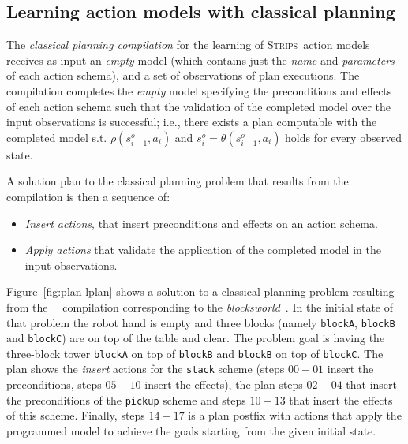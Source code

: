 \documentclass{article}
\newcommand{\strips}{\textsc{Strips}}
\begin{document}
\subsection{Learning action models with classical planning}
The {\em classical planning compilation} for the learning of \strips\ action models~\cite{aineto2018learning} receives as input an {\em empty} model (which contains just the {\em name} and {\em parameters} of each action schema), and a set of observations of plan executions. The compilation completes the {\em empty} model specifying the preconditions and effects of each action schema such that the validation of the completed model over the input observations is successful; i.e., there exists a plan computable with the completed model s.t. $\rho(s_{i-1}^o,a_i)$ and $s_i^o=\theta(s_{i-1}^o,a_i)$ holds for every observed state.

A solution plan to the classical planning problem that results from the compilation is then a sequence of:
\begin{itemize}
\item \emph{Insert actions}, that insert preconditions and effects on an action schema.
\item \emph{Apply actions} that validate the application of the completed model in the input observations.
\end{itemize}
Figure~\ref{fig:plan-lplan} shows a solution to a classical planning problem resulting from the~\citeauthor{aineto2018learning}~\citeyear{aineto2018learning} compilation corresponding to the {\em blocksworld}~\cite{slaney2001blocks}. In the initial state of that problem the robot hand is empty and three blocks (namely {\small\tt blockA}, {\small\tt blockB} and {\small\tt blockC}) are on top of the table and clear. The problem goal is having the three-block tower {\tt blockA} on top of {\tt blockB} and {\tt blockB} on top of {\tt blockC}. The plan shows the {\em insert} actions for the {\tt\small stack} scheme (steps $00-01$ insert the preconditions, steps $05-10$ insert the effects), the plan steps $02-04$ that  insert the preconditions of the {\tt\small pickup} scheme and steps $10-13$ that insert the effects of this scheme. Finally, steps $14-17$ is a plan postfix with actions that apply the programmed model to achieve the goals starting from the given initial state.
\end{document}
